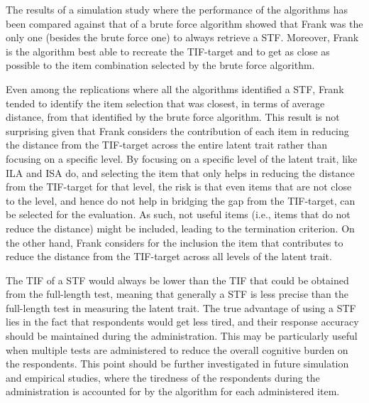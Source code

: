 \documentclass[12pt, a4paper, titilepage]{article}
\begin{document}
The results of a simulation study where the performance of the algorithms has been compared against that of a brute force algorithm showed that Frank was the only one (besides the brute force one) to always retrieve a STF. Moreover, Frank is the algorithm best able to recreate the TIF-target and to get as close as possible to the item combination selected by the brute force algorithm.

Even among the replications where all the algorithms identified a STF, Frank tended to identify the item selection that was closest, in terms of average distance, from that identified by the brute force algorithm. This result is not surprising given that Frank considers the contribution of each item in reducing the distance from the TIF-target across the entire latent trait rather than focusing on a specific level. By focusing on a specific level of the latent trait, like ILA and ISA do, and selecting the item that only helps in reducing the distance from the TIF-target for that level, the risk is that even items that are not close to the level, and hence do not help in bridging the gap from the TIF-target, can be selected for the evaluation. As such, not useful items (i.e., items that do not reduce the distance) might be included, leading to the termination criterion. On the other hand, Frank considers for the inclusion the item that contributes to reduce the distance from the TIF-target across all levels of the latent trait.


The TIF of a STF would always be lower than the TIF that could be obtained from the full-length test, meaning that generally a STF is less precise than the full-length test in measuring the latent trait. 
The true advantage of using a STF lies in the fact that respondents would get less tired, and their response accuracy should be maintained during the administration. This may be particularly useful when multiple tests are administered to reduce the overall cognitive burden on the respondents.   
This point should be further investigated in future simulation and empirical studies, where the tiredness of the respondents during the administration is accounted for by the algorithm for each administered item.
\end{document}
